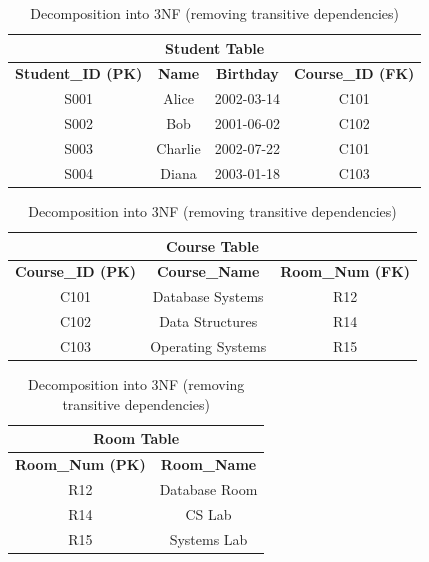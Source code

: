 \begin{table}[h!]
\centering
\caption{Decomposition into 3NF (removing transitive dependencies)}
\label{tab:after_3nf}
\begin{tabular}{|c|c|c|c|}
\hline
\multicolumn{4}{|c|}{\textbf{Student Table}} \\
\hline
\textbf{Student\_ID (PK)} & \textbf{Name} & \textbf{Birthday} & \textbf{Course\_ID (FK)} \\
\hline
S001 & Alice & 2002-03-14 & C101 \\
S002 & Bob & 2001-06-02 & C102 \\
S003 & Charlie & 2002-07-22 & C101 \\
S004 & Diana & 2003-01-18 & C103 \\
\hline
\end{tabular}

\vspace{1em}

\begin{tabular}{|c|c|c|}
\hline
\multicolumn{3}{|c|}{\textbf{Course Table}} \\
\hline
\textbf{Course\_ID (PK)} & \textbf{Course\_Name} & \textbf{Room\_Num (FK)} \\
\hline
C101 & Database Systems & R12 \\
C102 & Data Structures & R14 \\
C103 & Operating Systems & R15 \\
\hline
\end{tabular}

\vspace{1em}

\begin{tabular}{|c|c|}
\hline
\multicolumn{2}{|c|}{\textbf{Room Table}} \\
\hline
\textbf{Room\_Num (PK)} & \textbf{Room\_Name} \\
\hline
R12 & Database Room \\
R14 & CS Lab \\
R15 & Systems Lab \\
\hline
\end{tabular}
\end{table}